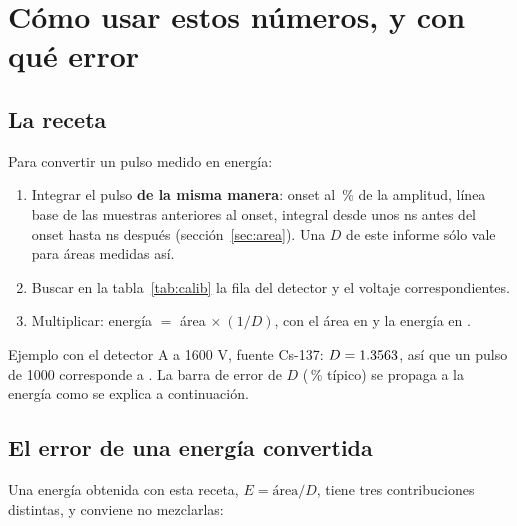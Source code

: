\documentclass[11pt,a4paper]{article}
\begin{document}
\section{Cómo usar estos números, y con qué error}
\label{sec:uso}

\subsection{La receta}

Para convertir un pulso medido en energía:

\begin{enumerate}
\item Integrar el pulso \textbf{de la misma manera}: onset al \FracOnset\,\%
      de la amplitud, línea base de las muestras anteriores al onset, integral
      desde unos \PreMin{} ns antes del onset hasta \PostFijo{} ns después
      (sección~\ref{sec:area}). Una $D$ de este informe sólo vale para áreas
      medidas así.
\item Buscar en la tabla~\ref{tab:calib} la fila del detector y el voltaje
      correspondientes.
\item Multiplicar: energía $=$ área $\times\ (1/D)$, con el área en \mVns{} y
      la energía en \keVdep.
\end{enumerate}

Ejemplo con el detector A a 1600 V, fuente Cs-137: $D = 1.3563$, así que un
pulso de 1000 \mVns{} corresponde a \EjemploKeV{} \keVdep. La barra de error de
$D$ (\ErrRelMediano\,\% típico) se propaga a la energía como se explica a
continuación.

\subsection{El error de una energía convertida}
\label{sec:error-energia}

Una energía obtenida con esta receta, $E = \text{área}/D$, tiene tres
contribuciones distintas, y conviene no mezclarlas:
\end{document}
